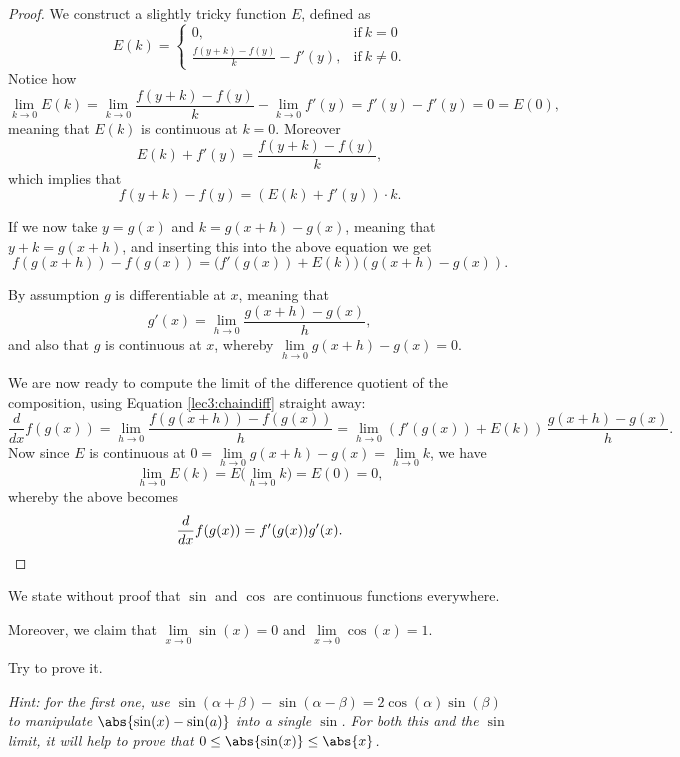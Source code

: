 \begin{proof}
	We construct a slightly tricky function $E$, defined as
	\[
		E(k) = \begin{cases}
		0, & \text{if}~ k = 0 \\
		\frac{f(y + k) - f(y)}{k} - f'(y), & \text{if}~ k \neq 0.
		\end{cases}
	\]
	Notice how
	\[
		\lim_{k \to 0} E(k) = \lim_{k \to 0} \frac{f(y + k) - f(y)}{k} - \lim_{k \to 0} f'(y) = f'(y) - f'(y) = 0 = E(0),
	\]
	meaning that $E(k)$ is continuous at $k = 0$.
	Moreover
	\[
		E(k) + f'(y) = \frac{f(y + k) - f(y)}{k},
	\]
	which implies that
	\[
		f(y + k) - f(y) = (E(k) + f'(y)) \cdot k.
	\]

	\noindent
	If we now take $y = g(x)$ and $k = g(x + h) - g(x)$, meaning that $y + k = g(x + h)$, and inserting this into the above equation we get
	\begin{equation}\label{lec3:chaindiff}
		f(g(x + h)) - f(g(x)) = \big (f'(g(x)) + E(k) \big ) (g(x + h) - g(x)).
	\end{equation}

	\noindent
	By assumption $g$ is differentiable at $x$, meaning that
	\[
		g'(x) = \lim_{h \to 0} \frac{g(x + h) - g(x)}{h},
	\]
	and also that $g$ is continuous at $x$, whereby $\lim\limits_{h \to 0} g(x + h) - g(x) = 0$.

	We are now ready to compute the limit of the difference quotient of the composition, using Equation \ref{lec3:chaindiff} straight away:
	\[
		\frac{d}{d x} f(g(x)) = \lim_{h \to 0} \frac{f(g(x + h)) - f(g(x))}{h} = \lim_{h \to 0} (f'(g(x)) + E(k)) \, \frac{g(x + h) - g(x)}{h}.
	\]
	Now since $E$ is continuous at $0 = \lim\limits_{h \to 0} g(x + h) - g(x) = \lim\limits_{h \to 0} k$, we have
	\[
		\lim_{h \to 0} E(k) = E \Big ( \lim_{h \to 0} k \Big ) = E(0) = 0,
	\]
	whereby the above becomes
	\[
		\frac{d}{d x} f(g(x)) = f'(g(x)) g'(x). \qedhere
	\]
\end{proof}


We state without proof that $\sin$ and $\cos$ are continuous functions everywhere.

Moreover, we claim that $\lim\limits_{x \to 0} \sin(x) = 0$ and $\lim\limits_{x \to 0} \cos(x) = 1$.

\begin{exercise}
	Try to prove it.

	\emph{Hint: for the first one, use $\sin(\alpha + \beta) - \sin(\alpha - \beta) = 2 \cos(\alpha)\sin(\beta)$ to manipulate $\abs{\sin(x) - \sin(a)}$ into a single $\sin$.
	For both this and the $\sin$ limit, it will help to prove that $0 \leq \abs{\sin(x)} \leq \abs{x}$.}
\end{exercise}

